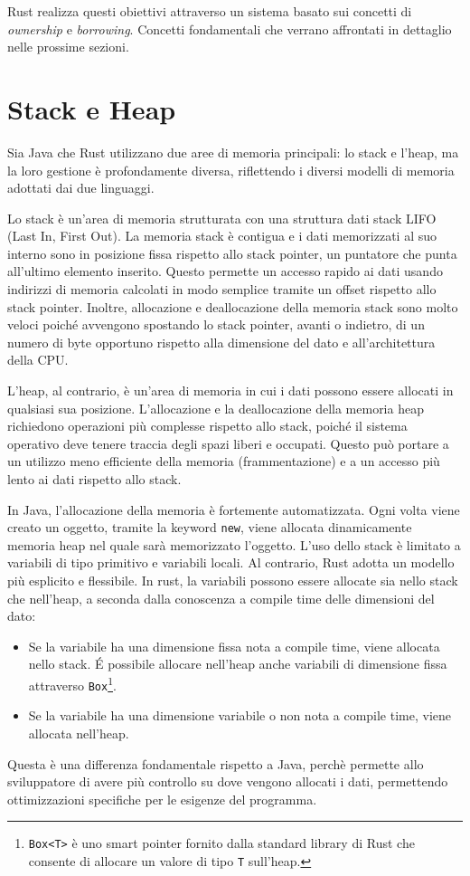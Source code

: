 Rust realizza questi obiettivi attraverso un sistema basato sui concetti di \textit{ownership} e \textit{borrowing}. Concetti fondamentali che verrano affrontati in dettaglio nelle prossime sezioni.

\section{Stack e Heap}
Sia Java che Rust utilizzano due aree di memoria principali: lo stack e l'heap, ma la loro gestione è profondamente diversa, riflettendo i diversi modelli di memoria adottati dai due linguaggi.

Lo stack è un'area di memoria strutturata con una struttura dati stack LIFO (Last In, First Out). La memoria stack è contigua e i dati memorizzati al suo interno sono in posizione fissa rispetto allo stack pointer, un puntatore che punta all'ultimo elemento inserito. Questo permette un accesso rapido ai dati usando indirizzi di memoria calcolati in modo semplice tramite un offset rispetto allo stack pointer. Inoltre, allocazione e deallocazione della memoria stack sono molto veloci poiché avvengono spostando lo stack pointer, avanti o indietro, di un numero di byte opportuno rispetto alla dimensione del dato e all'architettura della CPU.

L'heap, al contrario, è un'area di memoria in cui i dati possono essere allocati in qualsiasi sua posizione. L'allocazione e la deallocazione della memoria heap richiedono operazioni più complesse rispetto allo stack, poiché il sistema operativo deve tenere traccia degli spazi liberi e occupati. Questo può portare a un utilizzo meno efficiente della memoria (frammentazione) e a un accesso più lento ai dati rispetto allo stack. 

In Java, l'allocazione della memoria è fortemente automatizzata. Ogni volta viene creato un oggetto, tramite la keyword \texttt{new}, viene allocata dinamicamente memoria heap nel quale sarà memorizzato l'oggetto. L'uso dello stack è limitato a variabili di tipo primitivo e variabili locali. Al contrario, Rust adotta un modello più esplicito e flessibile. In rust, la variabili possono essere allocate sia nello stack che nell'heap, a seconda dalla conoscenza a compile time delle dimensioni del dato:
\begin{itemize}
    \item  Se la variabile ha una dimensione fissa nota a compile time, viene allocata nello stack. É possibile allocare nell'heap anche variabili di dimensione fissa attraverso \texttt{Box}\footnote{\texttt{Box<T>} è uno smart pointer fornito dalla standard library di Rust che consente di allocare un valore di tipo \texttt{T} sull'heap.}.
    \item  Se la variabile ha una dimensione variabile o non nota a compile time, viene allocata nell'heap. 
\end{itemize} 
Questa è una differenza fondamentale rispetto a Java, perchè permette allo sviluppatore di avere più controllo su dove vengono allocati i dati, permettendo ottimizzazioni specifiche per le esigenze del programma. 

